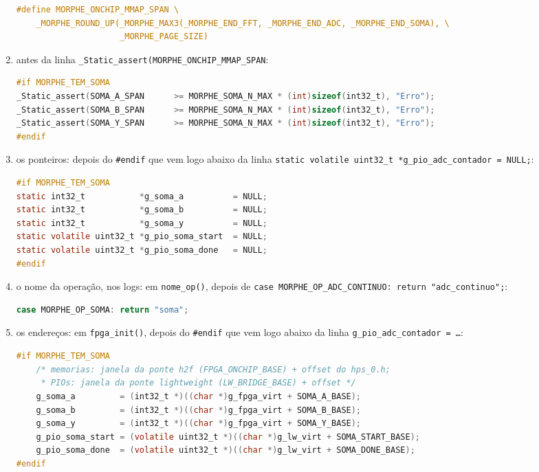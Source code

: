 \documentclass[11pt,a4paper,oneside]{article}
\begin{document}
\begin{faca}
\begin{enumerate}
\begin{lstlisting}[language=C,basicstyle=\ttfamily\scriptsize]
#define MORPHE_ONCHIP_MMAP_SPAN \
    _MORPHE_ROUND_UP(_MORPHE_MAX3(_MORPHE_END_FFT, _MORPHE_END_ADC, _MORPHE_END_SOMA), \
                     _MORPHE_PAGE_SIZE)
\end{lstlisting}
  \item antes da linha \texttt{\_Static\_assert(MORPHE\_ONCHIP\_MMAP\_SPAN}:
\begin{lstlisting}[language=C,basicstyle=\ttfamily\scriptsize]
#if MORPHE_TEM_SOMA
_Static_assert(SOMA_A_SPAN      >= MORPHE_SOMA_N_MAX * (int)sizeof(int32_t), "Erro");
_Static_assert(SOMA_B_SPAN      >= MORPHE_SOMA_N_MAX * (int)sizeof(int32_t), "Erro");
_Static_assert(SOMA_Y_SPAN      >= MORPHE_SOMA_N_MAX * (int)sizeof(int32_t), "Erro");
#endif
\end{lstlisting}
  \item os ponteiros: depois do \texttt{\#endif} que vem logo abaixo da linha \texttt{static volatile uint32\_t *g\_pio\_adc\_contador = NULL;}:
\begin{lstlisting}[language=C]
#if MORPHE_TEM_SOMA
static int32_t           *g_soma_a          = NULL;
static int32_t           *g_soma_b          = NULL;
static int32_t           *g_soma_y          = NULL;
static volatile uint32_t *g_pio_soma_start  = NULL;
static volatile uint32_t *g_pio_soma_done   = NULL;
#endif
\end{lstlisting}
  \item o nome da operação, nos logs: em \texttt{nome\_op()}, depois de \texttt{case MORPHE\_OP\_ADC\_CONTINUO: return "adc\_continuo";}:
\begin{lstlisting}[language=C]
        case MORPHE_OP_SOMA: return "soma";
\end{lstlisting}
  \item os endereços: em \texttt{fpga\_init()}, depois do \texttt{\#endif} que vem logo abaixo da linha \texttt{g\_pio\_adc\_contador = \ldots}:
\begin{lstlisting}[language=C,basicstyle=\ttfamily\scriptsize]
#if MORPHE_TEM_SOMA
    /* memorias: janela da ponte h2f (FPGA_ONCHIP_BASE) + offset do hps_0.h;
     * PIOs: janela da ponte lightweight (LW_BRIDGE_BASE) + offset */
    g_soma_a         = (int32_t *)((char *)g_fpga_virt + SOMA_A_BASE);
    g_soma_b         = (int32_t *)((char *)g_fpga_virt + SOMA_B_BASE);
    g_soma_y         = (int32_t *)((char *)g_fpga_virt + SOMA_Y_BASE);
    g_pio_soma_start = (volatile uint32_t *)((char *)g_lw_virt + SOMA_START_BASE);
    g_pio_soma_done  = (volatile uint32_t *)((char *)g_lw_virt + SOMA_DONE_BASE);
#endif
\end{lstlisting}

\end{enumerate}
\end{faca}
\end{document}
